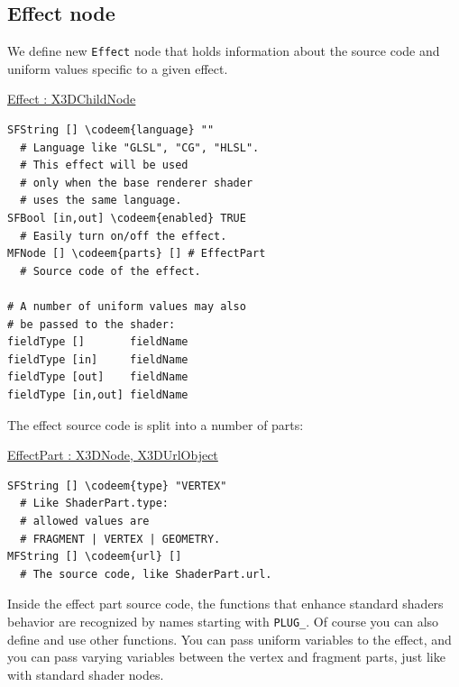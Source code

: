 \documentclass{egpubl}
\newenvironment{mycode}
{\begin{mycodecore}}
{\end{mycodecore}
\vspace{-0.1in}}
\newcommand*{\codeem}[1]{\textbf{#1}}
\begin{document}
\subsection{Effect node}

We define new \texttt{Effect} node that holds information about
the source code and uniform values specific to a given effect.

\begin{mycode}
\underline{Effect : X3DChildNode}
\begin{Verbatim}[commandchars=\\\{\},fontsize=\small]
SFString [] \codeem{language} ""
  # Language like "GLSL", "CG", "HLSL".
  # This effect will be used
  # only when the base renderer shader
  # uses the same language.
SFBool [in,out] \codeem{enabled} TRUE
  # Easily turn on/off the effect.
MFNode [] \codeem{parts} [] # EffectPart
  # Source code of the effect.

# A number of uniform values may also
# be passed to the shader:
fieldType []       fieldName
fieldType [in]     fieldName
fieldType [out]    fieldName
fieldType [in,out] fieldName
\end{Verbatim}
\end{mycode}



\needspace{1in}
The effect source code is split into a number of parts:

\begin{mycode}
\underline{EffectPart : X3DNode, X3DUrlObject}
\begin{Verbatim}[commandchars=\\\{\},fontsize=\small]
SFString [] \codeem{type} "VERTEX"
  # Like ShaderPart.type:
  # allowed values are
  # FRAGMENT | VERTEX | GEOMETRY.
MFString [] \codeem{url} []
  # The source code, like ShaderPart.url.
\end{Verbatim}
\end{mycode}


Inside the effect part source code, the functions that enhance
standard shaders behavior are recognized by names starting with \texttt{PLUG\_}.
Of course you can also define and use other functions.
You can pass uniform variables to the effect,
and you can pass varying variables between the vertex and fragment
parts, just like with standard shader nodes.
\end{document}
